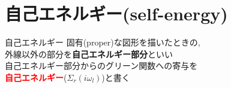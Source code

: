 \documentclass[dvipdfmx,10pt]{beamer}
\begin{document}
\section{自己エネルギー(self-energy)}
\begin{frame}
    \begin{block}{自己エネルギー}
        \centering
        固有(proper)な図形を描いたときの, \\
        外線以外の部分を{\bf 自己エネルギー部分}といい\\
        自己エネルギー部分からのグリーン関数への寄与を\\
        {\bf \textcolor{red}{自己エネルギー}}($\Sigma_r(i\omega_l)$)と書く
    \end{block}
\end{frame}
\end{document}
